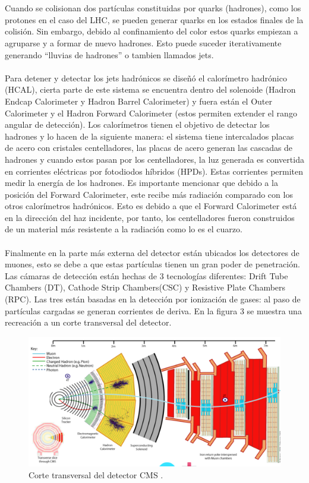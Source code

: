 \\
\\
Cuando se colisionan dos partículas constituidas por quarks (hadrones), como los protones en el caso del LHC, se pueden generar quarks en los estados finales de la colisión. Sin embargo, debido al confinamiento del color estos quarks empiezan a agruparse y a formar de nuevo hadrones. Esto puede suceder iterativamente generando ``lluvias de hadrones'' o tambien llamados jets.
\\
\\
Para detener y detectar los jets hadrónicos se diseñó el calorímetro hadrónico (HCAL), cierta parte de este sistema se encuentra dentro del solenoide (Hadron Endcap Calorimeter y Hadron Barrel Calorimeter) y fuera están el Outer Calorimeter y el Hadron Forward Calorimeter (estos permiten extender el rango angular de detección). Los calorímetros tienen el objetivo de detectar los hadrones y lo hacen de la siguiente manera: el sistema tiene intercalados placas de acero con cristales centelladores, las placas de acero generan las cascadas de hadrones y cuando estos pasan por los centelladores, la luz generada es convertida en corrientes eléctricas por fotodiodos híbridos (HPDs). Estas corrientes permiten medir la energía de los hadrones. Es importante mencionar que debido a la posición del Forward Calorimeter, este recibe más radiación comparado con los otros calorímetros hadrónicos. Esto es debido a que el Forward Calorimeter está en la dirección del haz incidente, por tanto, los centelladores fueron construidos de un material más resistente a la radiación como lo es el cuarzo.
\\
\\
Finalmente en la parte más externa del detector están ubicados los detectores de muones, esto se debe a que estas partículas tienen un gran poder de penetración. Las cámaras de detección están hechas de 3 tecnologías diferentes: Drift Tube Chambers (DT), Cathode Strip Chambers(CSC) y Resistive Plate Chambers (RPC). Las tres están basadas en la detección por ionización de gases: al paso de partículas cargadas se generan corrientes de deriva. En la figura 3 se muestra una recreación a un corte transversal del detector.
\begin{figure}
\centering
\includegraphics[width=15cm]{F3.png}
\caption{\label{fig:frog} Corte transversal del detector CMS \cite{Bayatian:2006nff}.}
\end{figure}

